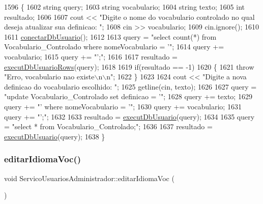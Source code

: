 \begin{DoxyCode}
1596 \{
1602     \textcolor{keywordtype}{string} query;
1603     \textcolor{keywordtype}{string} vocabulario;
1604     \textcolor{keywordtype}{string} texto;
1605     \textcolor{keywordtype}{int} resultado;
1606 
1607     cout << \textcolor{stringliteral}{"Digite o nome do vocabulario controlado no qual deseja atualizar sua definicao: "};
1608     cin >> vocabulario;
1609     cin.ignore();
1610 
1611     \mbox{\hyperlink{comando_sql_8cpp_a4f89ddcbc4cf8f2587d89f72f8c7900d}{conectarDbUsuario}}();
1612 
1613     query = \textcolor{stringliteral}{"select count(*) from Vocabulario\_Controlado where nomeVocabulario = '"};
1614     query += vocabulario;
1615     query += \textcolor{stringliteral}{"';"};
1616 
1617     resultado = \mbox{\hyperlink{comando_sql_8cpp_af54952694f2fa7d76f969fb74b853cb9}{executDbUsuarioRows}}(query);
1618 
1619     \textcolor{keywordflow}{if}(resultado == -1)
1620     \{
1621       \textcolor{keywordflow}{throw} \textcolor{stringliteral}{"Erro, vocabulario nao existe\(\backslash\)n\(\backslash\)n"};
1622     \}
1623 
1624     cout << \textcolor{stringliteral}{"Digite a nova definicao do vocabulario escolhido: "};
1625     getline(cin, texto);
1626 
1627     query = \textcolor{stringliteral}{"update Vocabulario\_Controlado set definicao = '"};
1628     query += texto;
1629     query += \textcolor{stringliteral}{"' where nomeVocabulario = '"};
1630     query += vocabulario;
1631     query += \textcolor{stringliteral}{"';"};
1632 
1633     resultado = \mbox{\hyperlink{comando_sql_8cpp_a748197580e7f9acdbf48c78de1f7924b}{executDbUsuario}}(query);
1634 
1635     query = \textcolor{stringliteral}{"select * from Vocabulario\_Controlado;"};
1636 
1637     resultado = \mbox{\hyperlink{comando_sql_8cpp_a748197580e7f9acdbf48c78de1f7924b}{executDbUsuario}}(query);
1638 \}
\end{DoxyCode}
\mbox{\label{class_servico_usuarios_administrador_ac0d400904b25cd30911a446bce66603a}} 
\subsubsection{\texorpdfstring{editar\+Idioma\+Voc()}{editarIdiomaVoc()}}
{\footnotesize\ttfamily void Servico\+Usuarios\+Administrador\+::editar\+Idioma\+Voc (\begin{DoxyParamCaption}{ }\end{DoxyParamCaption})\hspace{0.3cm}{\ttfamily [virtual]}}

